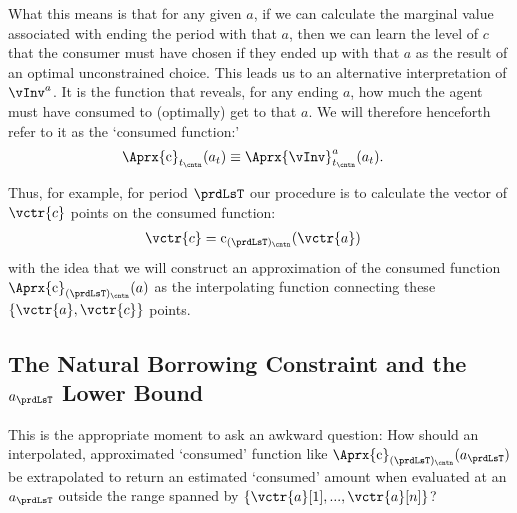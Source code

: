 \documentclass[titlepage, headings=optiontotocandhead]{econtex}
\begin{document}
What this means is that for any given $a$, if we can calculate the marginal value associated with ending the period with that $a$, then we can learn the level of $c$ that the consumer must have chosen if they ended up with that $a$ as the result of an optimal unconstrained choice.  This leads us to an alternative interpretation of $\vInv^{a}$. It is the function that reveals, for any ending $a$, how much the agent must have consumed to (optimally) get to that $a$.  We will therefore henceforth refer to it as the `consumed function:'
\begin{equation}\begin{gathered}\begin{aligned}
      \Aprx{\mathrm{c}}_{t_\cntn}(a_{t}) & \equiv \Aprx{\vInv}^{a}_{t_\cntn}(a_{t}) \label{eq:consumedfn}.    
    \end{aligned}\end{gathered}\end{equation}

Thus, for example, for period $\prdLsT$ our procedure is to calculate the vector of $\vctr{c}$ points on the consumed function:
\begin{equation}\begin{gathered}\begin{aligned}
      \vctr{c} & = \mathrm{c}_{(\prdLsT)_\cntn}(\vctr{a}) \label{eq:consumedfnvecs}     
    \end{aligned}\end{gathered}\end{equation}
with the idea that we will construct an approximation of the consumed function $\Aprx{\mathrm{c}}_{(\prdLsT)_\cntn}(a)$ as the interpolating function connecting these $\{\vctr{a},\vctr{c}\}$ points.

\hypertarget{the-natural-borrowing-constraint-and-the-a-lower-bound}{}
\subsection{The Natural Borrowing Constraint and the $a_{\prdLsT}$ Lower Bound} \label{subsec:LiqConstrSelfImposed}

This is the appropriate moment to ask an awkward question: How should an interpolated, approximated `consumed' function like $\Aprx{\mathrm{c}}_{(\prdLsT)_\cntn}(a_{\prdLsT})$ be extrapolated to return an estimated `consumed' amount when evaluated at an $a_{\prdLsT}$ outside the range spanned by $\{\vctr{a}[1],...,\vctr{a}[n]\}$?
\end{document}
